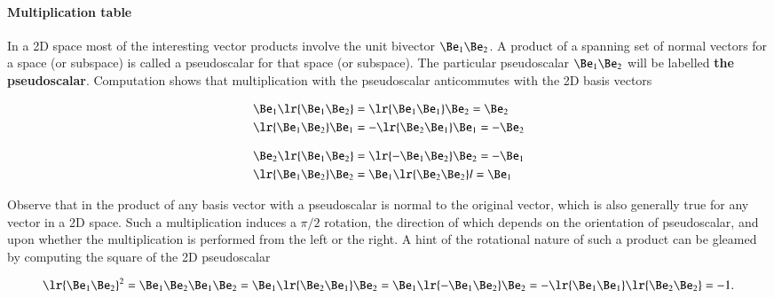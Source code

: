 
\paragraph{Multiplication table}

In a 2D space most of the interesting vector products involve the unit bivector \( \Be_1 \Be_2 \).  A product of a spanning set of normal vectors for a space (or subspace) is called a pseudoscalar for that space (or subspace).  The particular pseudoscalar \( \Be_1 \Be_2 \) will be labelled \textbf{the pseudoscalar}.  Computation shows that multiplication with the pseudoscalar anticommutes with the 2D basis vectors

\begin{dmath}\label{eqn:SimpleProducts2:180}
\begin{aligned}
   \Be_1 \lr{ \Be_1 \Be_2 } &= \lr{ \Be_1 \Be_1 } \Be_2 = \Be_2 \\
   \lr{ \Be_1 \Be_2 } \Be_1 &= -\lr{ \Be_2 \Be_1 } \Be_1 = -\Be_2 \\
\end{aligned}
\end{dmath}

\begin{dmath}\label{eqn:SimpleProducts2:200}
\begin{aligned}
   \Be_2 \lr{ \Be_1 \Be_2 } &= \lr{ -\Be_1 \Be_2 } \Be_2 = -\Be_1 \\
   \lr{ \Be_1 \Be_2 } \Be_2 &= \Be_1 \lr{ \Be_2 \Be_2 } l= \Be_1 \\
\end{aligned}
\end{dmath}

Observe that in  the product of any basis vector with a pseudoscalar is normal to the original vector, which is also generally true for any vector in a 2D space.  Such a multiplication induces a \( \pi/2 \) rotation, the direction of which depends on the orientation of pseudoscalar, and upon whether the multiplication is performed from the left or the right.  A hint of the rotational nature of such a product can be gleamed by computing the square of the 2D pseudoscalar

\begin{dmath}\label{eqn:SimpleProducts2:220}
   \lr{ \Be_1 \Be_2 }^2
   =
   \Be_1 \Be_2
   \Be_1 \Be_2
   =
   \Be_1 \lr{ \Be_2
   \Be_1 } \Be_2
   =
   \Be_1 \lr{ -\Be_1
   \Be_2 } \Be_2
   =
   -\lr{ \Be_1 \Be_1 }
   \lr{ \Be_2 \Be_2 }
   = -1.
\end{dmath}

